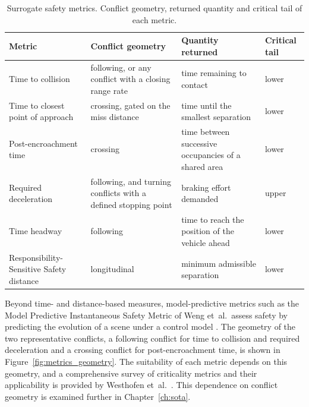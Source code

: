 \begin{table}[htbp]
    \centering
    \caption[Surrogate safety metrics]{Surrogate safety metrics. Conflict geometry, returned quantity and critical tail of each metric.}
    \label{tab:surrogate_metrics}
    \small
    \begin{tabular}{@{}>{\raggedright\arraybackslash}p{3.5cm} >{\raggedright\arraybackslash}p{3.3cm} >{\raggedright\arraybackslash}p{3.4cm} >{\raggedright\arraybackslash}p{3.2cm}@{}}
        \toprule
        \textbf{Metric} & \textbf{Conflict geometry} & \textbf{Quantity returned} & \textbf{Critical tail} \\
        \midrule
        Time to collision & following, or any conflict with a closing range rate
        & time remaining to contact & lower \\[2pt]
        Time to closest point of approach & crossing, gated on the miss distance &
        time until the smallest separation & lower \\[2pt]
        Post-encroachment time & crossing & time between successive occupancies of a
        shared area & lower \\[2pt]
        Required deceleration & following, and turning conflicts with a defined
        stopping point & braking effort demanded & upper \\[2pt]
        Time headway & following & time to reach the position of the vehicle ahead &
        lower \\[2pt]
        Responsibility-Sensitive Safety distance & longitudinal & minimum admissible
        separation & lower \\
        \bottomrule
    \end{tabular}
\end{table}

Beyond time- and distance-based measures, model-predictive metrics such as the Model
Predictive Instantaneous Safety Metric of Weng et~al.\ assess safety by predicting the
evolution of a scene under a control model \cite{weng2020mprism}. The geometry of the
two representative conflicts, a following conflict for time to collision and required
deceleration and a crossing conflict for post-encroachment time, is shown in
Figure~\ref{fig:metrics_geometry}. The suitability of each metric depends on this
geometry, and a comprehensive survey of criticality metrics and their applicability is
provided by Westhofen et~al.\ \cite{westhofen2023}. This dependence on conflict geometry
is examined further in Chapter~\ref{ch:sota}.

